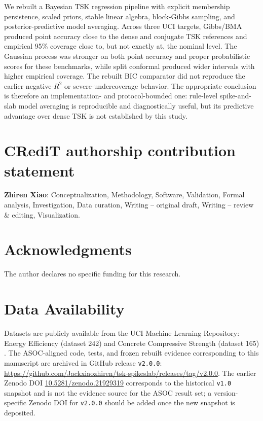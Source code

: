 \documentclass[1p,times]{elsarticle}
\begin{document}
We rebuilt a Bayesian TSK regression pipeline with explicit membership persistence, scaled priors, stable linear algebra, block-Gibbs sampling, and posterior-predictive model averaging.
Across three UCI targets, Gibbs/BMA produced point accuracy close to the dense and conjugate TSK references and empirical 95\% coverage close to, but not exactly at, the nominal level.
The Gaussian process was stronger on both point accuracy and proper probabilistic scores for these benchmarks, while split conformal produced wider intervals with higher empirical coverage.
The rebuilt BIC comparator did not reproduce the earlier negative-$R^2$ or severe-undercoverage behavior.
The appropriate conclusion is therefore an implementation- and protocol-bounded one: rule-level spike-and-slab model averaging is reproducible and diagnostically useful, but its predictive advantage over dense TSK is not established by this study.

\section*{CRediT authorship contribution statement}

\textbf{Zhiren Xiao}: Conceptualization, Methodology, Software, Validation, Formal analysis, Investigation, Data curation, Writing -- original draft, Writing -- review \& editing, Visualization.

\section*{Acknowledgments}

The author declares no specific funding for this research.

\section*{Data Availability}

Datasets are publicly available from the UCI Machine Learning Repository: Energy Efficiency (dataset 242) \cite{tsanas2012accurate} and Concrete Compressive Strength (dataset 165) \cite{yeh1998modeling}.
The ASOC-aligned code, tests, and frozen rebuilt evidence corresponding to this manuscript are archived in GitHub release \texttt{v2.0.0}: \url{https://github.com/Jackxiaozhiren/tsk-spikeslab/releases/tag/v2.0.0}.
The earlier Zenodo DOI \href{https://doi.org/10.5281/zenodo.21929319}{10.5281/zenodo.21929319} corresponds to the historical \texttt{v1.0} snapshot and is not the evidence source for the ASOC result set; a version-specific Zenodo DOI for \texttt{v2.0.0} should be added once the new snapshot is deposited.
\end{document}
